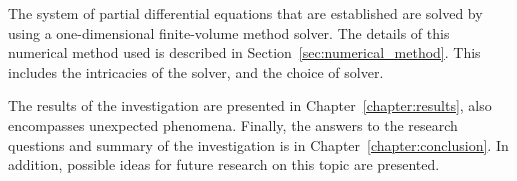 The system of partial differential equations that are established are solved by using a one-dimensional finite-volume method solver.
The details of this numerical method used is described in Section~\ref{sec:numerical_method}.
This includes the intricacies of the solver, and the choice of solver.

The results of the investigation are presented in Chapter~\ref{chapter:results}, also encompasses unexpected phenomena.
Finally, the answers to the research questions and summary of the investigation is in Chapter~\ref{chapter:conclusion}.
In addition, possible ideas for future research on this topic are presented.

